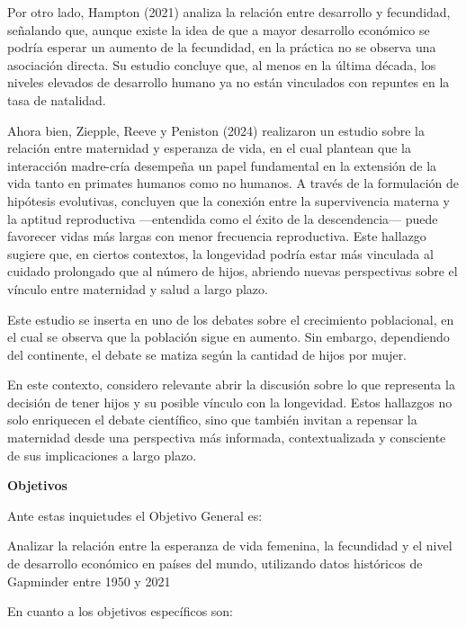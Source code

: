 \documentclass[
]{article}
\begin{document}
Por otro lado, Hampton (2021) analiza la relación entre desarrollo y
fecundidad, señalando que, aunque existe la idea de que a mayor
desarrollo económico se podría esperar un aumento de la fecundidad, en
la práctica no se observa una asociación directa. Su estudio concluye
que, al menos en la última década, los niveles elevados de desarrollo
humano ya no están vinculados con repuntes en la tasa de natalidad.

Ahora bien, Ziepple, Reeve y Peniston (2024) realizaron un estudio sobre
la relación entre maternidad y esperanza de vida, en el cual plantean
que la interacción madre-cría desempeña un papel fundamental en la
extensión de la vida tanto en primates humanos como no humanos. A través
de la formulación de hipótesis evolutivas, concluyen que la conexión
entre la supervivencia materna y la aptitud reproductiva ---entendida
como el éxito de la descendencia--- puede favorecer vidas más largas con
menor frecuencia reproductiva. Este hallazgo sugiere que, en ciertos
contextos, la longevidad podría estar más vinculada al cuidado
prolongado que al número de hijos, abriendo nuevas perspectivas sobre el
vínculo entre maternidad y salud a largo plazo.

Este estudio se inserta en uno de los debates sobre el crecimiento
poblacional, en el cual se observa que la población sigue en aumento.
Sin embargo, dependiendo del continente, el debate se matiza según la
cantidad de hijos por mujer.

En este contexto, considero relevante abrir la discusión sobre lo que
representa la decisión de tener hijos y su posible vínculo con la
longevidad. Estos hallazgos no solo enriquecen el debate científico,
sino que también invitan a repensar la maternidad desde una perspectiva
más informada, contextualizada y consciente de sus implicaciones a largo
plazo.

\textbf{Objetivos}

Ante estas inquietudes el Objetivo General es:

Analizar la relación entre la esperanza de vida femenina, la fecundidad
y el nivel de desarrollo económico en países del mundo, utilizando datos
históricos de Gapminder entre 1950 y 2021

En cuanto a los objetivos específicos son:
\end{document}
